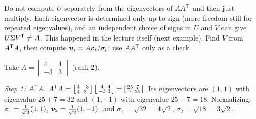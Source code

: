 \begin{trap}
Do not compute $U$ separately from the eigenvectors of $AA^{\mathsf{T}}$ and then just multiply. Each
eigenvector is determined only up to sign (more freedom still for repeated eigenvalues), and an
independent choice of signs in $U$ and $V$ can give $U\Sigma V^{\mathsf{T}}\ne A$. This happened in the lecture
itself (next example). Find $V$ from $A^{\mathsf{T}} A$, then compute $\boldsymbol{u}_i=A\boldsymbol{v}_i/\sigma_i$; use $AA^{\mathsf{T}}$ only as
a check.
\end{trap}

\begin{example}\label{ex:u33-4433}
Take $A=\begin{bmatrix}4&4\\-3&3\end{bmatrix}$ (rank $2$).

\emph{Step 1: $A^{\mathsf{T}} A$.}
$A^{\mathsf{T}} A=\left[\begin{smallmatrix}4&-3\\4&3\end{smallmatrix}\right]\left[\begin{smallmatrix}4&4\\-3&3\end{smallmatrix}\right]
=\left[\begin{smallmatrix}25&7\\7&25\end{smallmatrix}\right]$. Its eigenvectors are $(1,1)$ with
eigenvalue $25+7=32$ and $(1,-1)$ with eigenvalue $25-7=18$. Normalizing,
$\boldsymbol{v}_1=\tfrac{1}{\sqrt2}(1,1)$, $\boldsymbol{v}_2=\tfrac{1}{\sqrt2}(1,-1)$, and $\sigma_1=\sqrt{32}=4\sqrt2$,
$\sigma_2=\sqrt{18}=3\sqrt2$.


\end{example}
